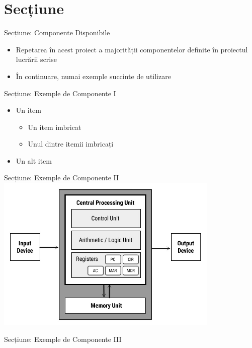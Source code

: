 \section{Secțiune}

\begin{frame}{Secțiune: Componente Disponibile} \pause
	\begin{itemize}
		\item Repetarea în acest proiect a majorității componentelor definite în proiectul lucrării scrise \pause
		\item În continuare, numai exemple succinte de utilizare
	\end{itemize}
\end{frame}

\begin{frame}{Secțiune: Exemple de Componente I} \pause
	\begin{itemize}
		\item Un item \pause
		    \begin{itemize}
		        \item Un item imbricat \pause
		        \item Unul dintre itemii imbricați \pause
	        \end{itemize}
		\item Un alt item
	\end{itemize}
\end{frame}

\begin{frame}{Secțiune: Exemple de Componente II}
	\includegraphics[width=0.8\textwidth, center]{components/images/architecture.jpg}
    \captionsetup{justification=centering,margin=1cm}
\end{frame}

\begin{frame}{Secțiune: Exemple de Componente III}
	
\end{frame}
